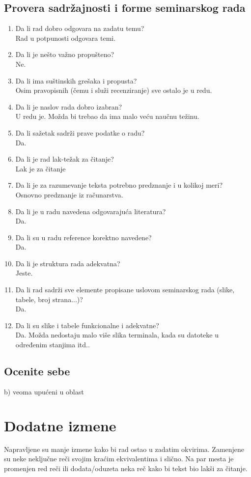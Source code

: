 \documentclass[a4paper]{report}
\begin{document}
\section{Provera sadržajnosti i forme seminarskog rada}
\begin{enumerate}
\item Da li rad dobro odgovara na zadatu temu?\\
Rad u potpunosti odgovara temi.
\item Da li je nešto važno propušteno?\\
Ne.
\item Da li ima suštinskih grešaka i propusta?\\
Osim pravopisnih (čemu i služi recenziranje) sve ostalo je u redu.
\item Da li je naslov rada dobro izabran?\\
U redu je. Možda bi trebao da ima malo veću naučnu težinu.
\item Da li sažetak sadrži prave podatke o radu?\\
Da.
\item Da li je rad lak-težak za čitanje?\\
Lak je za čitanje
\item Da li je za razumevanje teksta potrebno predznanje i u kolikoj meri?\\
Osnovno predznanje iz računarstva.
\item Da li je u radu navedena odgovarajuća literatura?\\
Da.
\item Da li su u radu reference korektno navedene?\\
Da.
\item Da li je struktura rada adekvatna?\\
Jeste.
\item Da li rad sadrži sve elemente propisane uslovom seminarskog rada (slike, tabele, broj strana...)?\\
Da.
\item Da li su slike i tabele funkcionalne i adekvatne?\\
Da. Možda nedostaju malo više slika terminala, kada su datoteke u određenim stanjima itd..
\end{enumerate}

\section{Ocenite sebe}
b) veoma upućeni u oblast


\chapter{Dodatne izmene}
Napravljene su manje izmene kako bi rad ostao u zadatim okvirima. Zamenjene su neke neključne reči svojim kraćim ekvivalentima i slično.
Na par mesta je promenjen red reči ili dodata/oduzeta neka reč kako bi tekst bio lakši za čitanje.
\end{document}
